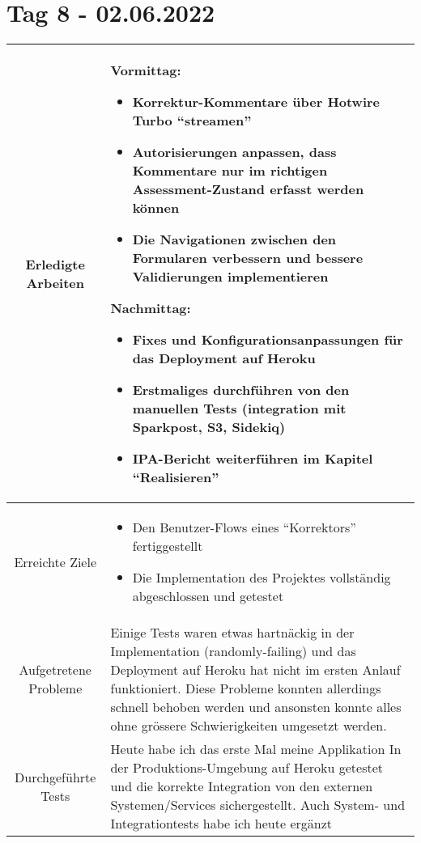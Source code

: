 \section{Tag 8 - 02.06.2022}

\begin{tabularx}{\textwidth}[H]{|c|X|}
    \hline
    Erledigte Arbeiten         &
    \textbf{Vormittag:}
    \begin{itemize}
        \item Korrektur-Kommentare über Hotwire Turbo \enquote{streamen}
        \item Autorisierungen anpassen, dass Kommentare nur im richtigen Assessment-Zustand erfasst werden können
        \item Die Navigationen zwischen den Formularen verbessern und bessere Validierungen implementieren
    \end{itemize}
    \textbf{Nachmittag:}
    \begin{itemize}
        \item Fixes und Konfigurationsanpassungen für das Deployment auf Heroku
        \item Erstmaliges durchführen von den manuellen Tests (integration mit Sparkpost, S3, Sidekiq)
        \item IPA-Bericht weiterführen im Kapitel \enquote{Realisieren}
    \end{itemize}
    \\ \hline

    Erreichte Ziele            &
    \begin{itemize}
        \item Den Benutzer-Flows eines \enquote{Korrektors} fertiggestellt
        \item Die Implementation des Projektes vollständig abgeschlossen und getestet
    \end{itemize}
    \\ \hline

    Aufgetretene Probleme      &
    Einige Tests waren etwas hartnäckig in der Implementation (randomly-failing) und das Deployment auf Heroku hat nicht im ersten Anlauf funktioniert. 
    Diese Probleme konnten allerdings schnell behoben werden und ansonsten konnte alles ohne grössere Schwierigkeiten umgesetzt werden.
    \\ \hline

    Durchgeführte Tests        &
    Heute habe ich das erste Mal meine Applikation In der Produktions-Umgebung auf Heroku getestet und die korrekte Integration von den externen Systemen/Services sichergestellt. Auch System- und Integrationtests habe ich heute ergänzt
    \\ \hline


\end{tabularx}
